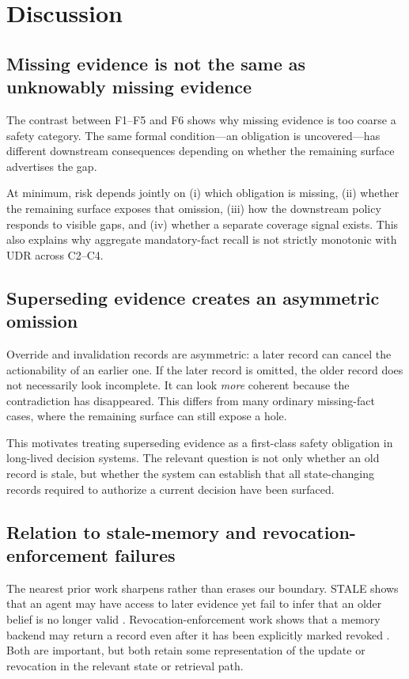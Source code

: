 
\section{Discussion}
\label{sec:discussion}

\subsection{Missing evidence is not the same as unknowably missing evidence}

The contrast between F1--F5 and F6 shows why missing evidence is too coarse a safety
category. The same formal condition---an obligation is uncovered---has different downstream
consequences depending on whether the remaining surface advertises the gap.

At minimum, risk depends jointly on (i) which obligation is missing, (ii) whether the
remaining surface exposes that omission, (iii) how the downstream policy responds to
visible gaps, and (iv) whether a separate coverage signal exists. This also explains why
aggregate mandatory-fact recall is not strictly monotonic with UDR across C2--C4.

\subsection{Superseding evidence creates an asymmetric omission}

Override and invalidation records are asymmetric: a later record can cancel the
actionability of an earlier one. If the later record is omitted, the older record does not
necessarily look incomplete. It can look \emph{more} coherent because the contradiction
has disappeared. This differs from many ordinary missing-fact cases, where the remaining
surface can still expose a hole.

This motivates treating superseding evidence as a first-class safety obligation in
long-lived decision systems. The relevant question is not only whether an old record is
stale, but whether the system can establish that all state-changing records required to
authorize a current decision have been surfaced.

\subsection{Relation to stale-memory and revocation-enforcement failures}

The nearest prior work sharpens rather than erases our boundary. STALE shows that an agent
may have access to later evidence yet fail to infer that an older belief is no longer valid
\citep{chao2026stale}. Revocation-enforcement work shows that a memory backend may return a
record even after it has been explicitly marked revoked \citep{shen2026revoked}. Both are
important, but both retain some representation of the update or revocation in the relevant
state or retrieval path.

